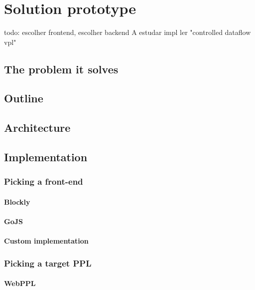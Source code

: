 \chapter{Solution prototype}\label{chap:chap3}

todo: escolher frontend, escolher backend
A estudar impl ler "controlled dataflow vpl"

\section{The problem it solves}


\section{Outline}

\section{Architecture}

\section{Implementation}

\subsection{Picking a front-end}

\subsubsection{Blockly}

\subsubsection{GoJS}

\subsubsection{Custom implementation}

\subsection{Picking a target PPL}

\subsubsection{WebPPL}

